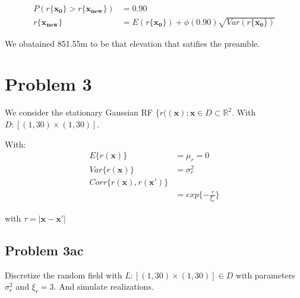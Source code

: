\documentclass[]{article}
\newcommand{\vect}[1]{\ensuremath{\boldsymbol{\mathbf{#1}}}}
\begin{document}
\begin{equation*}
    \begin{split}    
P(r\{\vect{x_0}\} >r\{\vect{x_{new}}\} ) &= 0.90\\
r\{\vect{x_{new}}\} &= E(r\{\vect{x_0}\}) + \phi(0.90) \sqrt{Var(r\{\vect{x_0}\})}
  \end{split}
\end{equation*}

We obatained 851.55m to be that elevation that satifies the preamble.

\newpage

\hypertarget{problem-3}{%
\section{Problem 3}\label{problem-3}}

We consider the stationary Gaussian RF
\(\lbrace r((\vect x); \vect x \in D \subset \mathbb{R}^2\). With
\(D:\left[(1,30) \times (1,30) \right]\).

With: \begin{equation}
    \begin{split}
        E\lbrace r(\vect x) \rbrace &= \mu_r = 0 \\
        Var\lbrace r(\vect x) \rbrace &= \sigma_r^2 \\
        Corr\lbrace r(\vect x), r(\vect x')\rbrace \\
        &= exp\lbrace -\frac{\tau}{\xi_r}\rbrace
    \end{split}
\end{equation}

with \(\tau = |\vect x - \vect x'|\)

\hypertarget{problem-3ac}{%
\subsection{Problem 3ac}\label{problem-3ac}}

Discretize the random field with
\(L:\left[(1,30) \times (1,30)\right] \in D\) with parameters
\(\sigma_r^2\) and \(\xi_r = 3\). And simulate realizations.
\end{document}
